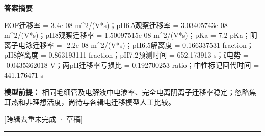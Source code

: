 \documentclass[UTF8,11pt,a4paper]{ctexart}
\begin{document}
\noindent\textbf{答案摘要}\par
EOF迁移率 = 3.4e-08 m\textasciicircum{}2/(V*s)；pH6.5观察迁移率 = 3.03405743e-08 m\textasciicircum{}2/(V*s)；pH8观察迁移率 = 1.50097515e-08 m\textasciicircum{}2/(V*s)；pKa = 7.2 pKa；阴离子电泳迁移率 = -2.2e-08 m\textasciicircum{}2/(V*s)；pH6.5解离度 = 0.166337531 fraction；pH8解离度 = 0.863193111 fraction；pH7.2预测时间 = 652.173913 s；ζ电势 = -0.0435362018 V；两pH迁移率亏损比 = 0.192700253 ratio；中性标记回代时间 = 441.176471 s\par
\noindent\textbf{模型前提：}
相同毛细管及电解液中电渗率、完全电离阴离子迁移率稳定；忽略焦耳热和非理想活度，尚待与各辑电迁移模型人工比较。\par
\noindent\textcolor{red!65!black}{[跨辑去重未完成 · 草稿]} \par
\medskip\hrule\medskip
{}
\end{document}
